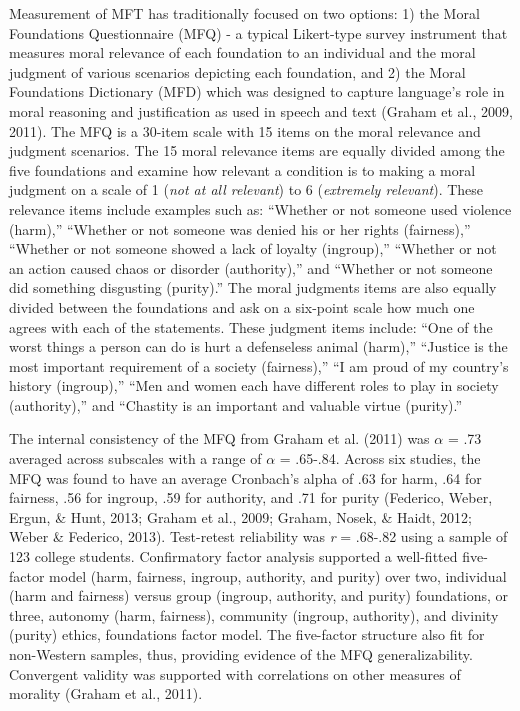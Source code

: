 \documentclass[
  man,floatsintext]{apa6}
\begin{document}
Measurement of MFT has traditionally focused on two options: 1) the
Moral Foundations Questionnaire (MFQ) - a typical Likert-type survey
instrument that measures moral relevance of each foundation to an
individual and the moral judgment of various scenarios depicting each
foundation, and 2) the Moral Foundations Dictionary (MFD) which was
designed to capture language's role in moral reasoning and justification
as used in speech and text (Graham et al., 2009, 2011). The MFQ is a
30-item scale with 15 items on the moral relevance and judgment
scenarios. The 15 moral relevance items are equally divided among the
five foundations and examine how relevant a condition is to making a
moral judgment on a scale of 1 (\emph{not at all relevant}) to 6 (\emph{extremely
relevant}). These relevance items include examples such as: ``Whether or
not someone used violence (harm),'' ``Whether or not someone was denied
his or her rights (fairness),'' ``Whether or not someone showed a lack
of loyalty (ingroup),'' ``Whether or not an action caused chaos or
disorder (authority),'' and ``Whether or not someone did something
disgusting (purity).'' The moral judgments items are also equally
divided between the foundations and ask on a six-point scale how much
one agrees with each of the statements. These judgment items include:
``One of the worst things a person can do is hurt a defenseless animal
(harm),'' ``Justice is the most important requirement of a society
(fairness),'' ``I am proud of my country's history (ingroup),'' ``Men
and women each have different roles to play in society (authority),''
and ``Chastity is an important and valuable virtue (purity).''

The internal consistency of the MFQ from Graham et al. (2011) was \(\alpha\) = .73
averaged across subscales with a range of \(\alpha\) = .65-.84. Across six
studies, the MFQ was found to have an average Cronbach's alpha of .63
for harm, .64 for fairness, .56 for ingroup, .59 for authority,
and .71 for purity (Federico, Weber, Ergun, \& Hunt, 2013; Graham et al., 2009; Graham, Nosek, \& Haidt, 2012; Weber \& Federico, 2013). Test-retest reliability was \emph{r} = .68-.82 using a sample of
123 college students. Confirmatory factor analysis supported a
well-fitted five-factor model (harm, fairness,
ingroup, authority, and purity) over two,
individual (harm and fairness) versus group (ingroup, authority,
and purity) foundations, or three, autonomy (harm, fairness),
community (ingroup, authority), and divinity (purity) ethics,
foundations factor model. The five-factor structure also fit for
non-Western samples, thus, providing evidence of the MFQ
generalizability. Convergent validity was supported with correlations on
other measures of morality (Graham et al., 2011).
\end{document}
